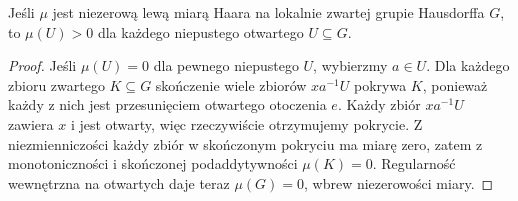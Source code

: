 \begin{wniosek}
\label{cor:haar-open-positive-23}
Jeśli $\mu$ jest niezerową lewą miarą Haara
na lokalnie zwartej grupie Hausdorffa $G$, to
$\mu(U)>0$ dla każdego niepustego otwartego $U\subseteq G$.
\end{wniosek}
\begin{proof}
Jeśli $\mu(U)=0$ dla pewnego niepustego $U$, wybierzmy
$a\in U$. Dla każdego zbioru zwartego $K\subseteq G$ skończenie
wiele zbiorów $xa^{-1}U$ pokrywa $K$, ponieważ każdy
z nich jest przesunięciem otwartego otoczenia $e$.
Każdy zbiór $xa^{-1}U$ zawiera $x$ i jest otwarty,
więc rzeczywiście otrzymujemy pokrycie. Z niezmienniczości
każdy zbiór w skończonym pokryciu ma miarę zero, zatem z monotoniczności
i skończonej podaddytywności $\mu(K)=0$.
Regularność wewnętrzna na otwartych daje teraz
$\mu(G)=0$, wbrew niezerowości miary.
\end{proof}

